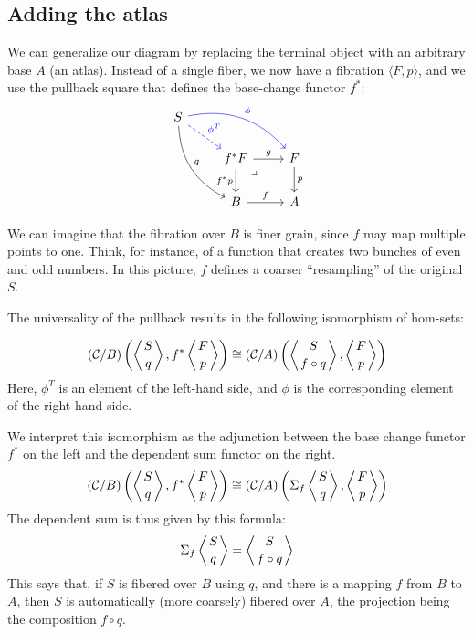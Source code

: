 \documentclass[DaoFP]{subfiles}
\begin{document}
\subsection{Adding the atlas}

We can generalize our diagram by replacing the terminal object with an arbitrary base $A$ (an atlas). Instead of a single fiber, we now have a fibration $\langle F, p \rangle$, and we use the pullback square that defines the base-change functor $f^*$:
\[
 \begin{tikzcd}
 S
 \arrow[dr, blue, dashed, "\phi^T"]
 \arrow[drr, blue, bend left, "\phi"]
 \arrow[ddr, bend right, "q"]
 \\
 &f^* F
\arrow[dr, phantom,  , very near start, "\lrcorner"]
 \arrow[r, "g"]
 \arrow[d, "f^* p"']
 &F
 \arrow[d, "p"]
 \\
 &B
 \arrow[r, "f"]
 &A
  \end{tikzcd}
\]

We can imagine that the fibration over $B$ is finer grain, since $f$ may map multiple points to one. Think, for instance, of a function  that creates two bunches of even and odd numbers. In this picture, $f$ defines a coarser ``resampling'' of the original $S$.

The universality of the pullback results in the following isomorphism of hom-sets:

\[  (\mathcal{C}/B) \left( \left \langle {S \atop q} \right \rangle , f^* \left \langle {F \atop p} \right \rangle \right) \cong (\mathcal{C}/A) \left( \left \langle {S \atop f \circ q } \right \rangle , \left \langle {F \atop p} \right \rangle \right)  \]
Here, $\phi^T$ is an element of the left-hand side, and $\phi$ is the corresponding element of the right-hand side. 

We interpret this isomorphism as the adjunction between the base change functor $f^*$ on the left and the dependent sum functor on the right. 
\[  (\mathcal{C}/B) \left( \left \langle {S \atop q} \right \rangle , f^* \left \langle {F \atop p} \right \rangle \right) \cong (\mathcal{C}/A) \left( \Sigma_f \left \langle {S \atop q} \right \rangle , \left \langle {F \atop p} \right \rangle \right)  \]
The dependent sum is thus given by this formula:
\[ \Sigma_f \left \langle {S \atop q} \right \rangle =  \left \langle {S \atop f \circ q} \right \rangle \]
This says that, if $S$ is fibered over $B$ using $q$, and there is a mapping $f$ from $B$ to $A$, then $S$ is automatically (more coarsely) fibered over $A$, the projection being the composition $f \circ q$. 
\end{document}
